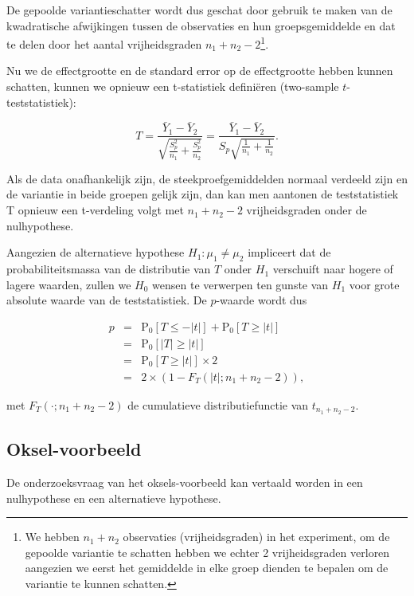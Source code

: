\documentclass[
  12pt,dutch,coursenotes]{book}
\begin{document}
De gepoolde variantieschatter wordt dus geschat door gebruik te maken van de kwadratische afwijkingen tussen de observaties en hun groepsgemiddelde en dat te delen door het aantal vrijheidsgraden \(n_1+n_2-2\)\footnote{We hebben \(n_1+n_2\) observaties (vrijheidsgraden) in het experiment, om de gepoolde variantie te schatten hebben we echter 2 vrijheidsgraden verloren aangezien we eerst het gemiddelde in elke groep dienden te bepalen om de variantie te kunnen schatten.}.

Nu we de effectgrootte en de standard error op de effectgrootte hebben kunnen schatten, kunnen we opnieuw een t-statistiek definiëren (two-sample \(t\)-teststatistiek):

\[T = \frac{\bar{Y}_1-\bar{Y}_2}{\sqrt{\frac{S_p^2}{n_1}+\frac{S_p^2}{n_2}}} =
  \frac{\bar{Y}_1 - \bar{Y}_2}{S_p\sqrt{\frac{1}{n_1}+\frac{1}{n_2}}}.\]

Als de data onafhankelijk zijn, de steekproefgemiddelden normaal verdeeld zijn en de variantie in beide groepen gelijk zijn, dan kan men aantonen de teststatistiek T opnieuw een t-verdeling volgt met \(n_1+n_2-2\) vrijheidsgraden onder de nulhypothese.

Aangezien de alternatieve hypothese \(H_1: \mu_1 \neq \mu_2\) impliceert dat de probabiliteitsmassa van de distributie van \(T\) onder \(H_1\) verschuift naar hogere of lagere waarden, zullen we \(H_0\) wensen te verwerpen ten gunste van \(H_1\) voor grote absolute waarde van de teststatistiek. De \(p\)-waarde wordt dus

\begin{eqnarray*}
  p&=&\text{P}_0\left[T\leq -|t|\right] + \text{P}_0\left[T\geq |t|\right]\\
  &=&\text{P}_0\left[\vert T\vert \geq \vert t \vert\right]\\
  &=&\text{P}_0\left[T \geq \vert t \vert\right]\times 2\\
  &=& 2\times(1-F_T(\vert t\vert;n_1+n_2-2)),
\end{eqnarray*}

met \(F_T(\cdot;n_1+n_2-2)\) de cumulatieve distributiefunctie van \(t_{n_1+n_2-2}\).

\hypertarget{oksel-voorbeeld}{%
\subsection{Oksel-voorbeeld}\label{oksel-voorbeeld}}

De onderzoeksvraag van het oksels-voorbeeld kan vertaald worden in een nulhypothese en een alternatieve hypothese.
\end{document}

